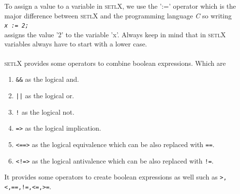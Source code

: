 \documentclass[11pt]{report}
\begin{document}
To assign a value to a variable in \textsc{setlX}, we use the ':=' operator which is the major difference between \textsc{setlX} and the programming language \textsl{C}
so writing 
\\[0.2cm]
\hspace*{1.3cm}
\texttt{\textsl{x := 2;}}
\\[0.2cm]
assigns the value '2' to the variable 'x'. Always keep in mind that in \textsc{setlX} variables always have to start with a lower case.
\\
\\
\textsc{setlX} provides some operators to combine boolean expressions. Which are
\begin{enumerate}
\item \texttt{\&\&} as the logical and.
\item \texttt{||} as the logical or.
\item \texttt{!} as the logical not.
\item \texttt{=>} as the logical implication.
\item \texttt{<==>} as the logical equivalence which can be also replaced with \texttt{==}.
\item \texttt{<!=>} as the logical antivalence which can be also replaced with \texttt{!=}.
\end{enumerate}
It provides some operators to create boolean expressions as well such as \texttt{>,<,==,!=,<=,>=}.
\end{document}
